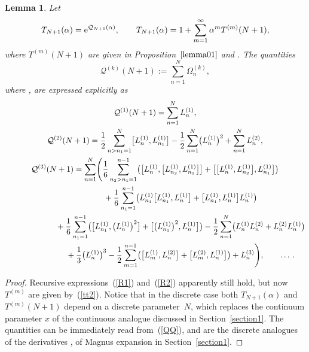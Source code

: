 \documentclass[pdftex]{sigma}
\numberwithin{equation}{section}
\newtheorem{lem}[thm]{Lemma}
\theoremstyle{definition}
\begin{document}
\begin{lem}\label{lemma2} Let
\[
T_{N+1}(\alpha) = {\rm e}^{{\mathcal Q}_{N+1}(\alpha)}, \qquad T_{N+1}(\alpha)= 1+ \sum_{m=1}^{\infty}\alpha^m T^{(m)}(N+1),
\]
 where $T^{(m)}({N+1})$ are given in Proposition~$\ref{lemma01}$ and . The quantities
\[
{\mathcal Q}^{(k)}(N+1):= \sum_{n=1}^N \Omega^{(k)}_n,\]
where , are expressed explicitly as
\begin{gather}
{\mathcal Q}^{(1)}(N+1) = \sum_{n=1}^{N} L^{(1)}_{n},\nonumber\\
{\mathcal Q}^{(2)}(N+1) = \frac{1}{2}\sum_{n>n_1=1}^{N} \bigl[ L^{(1)}_{n}, L^{(1)}_{n_1} \bigr] -
\frac{1}{2}\sum_{n=1}^{N} \bigl(L^{(1)}_{n}\bigr)^2+\sum_{n=1}^NL_n^{(2)},
\nonumber\\
{\mathcal Q}^{(3)}(N+1) = \sum_{n=1}^N \Biggl(\frac{1}{6} \sum_{n_2>n_1=1}^{n-1}
\bigl(\bigl[L^{(1)}_{n}, \bigl[L^{(1)}_{n_2}, L^{(1)}_{n_1} \bigr] \bigr] +
\bigl[\bigl[L^{(1)}_{n}, L^{(1)}_{n_2} \bigr], L^{(1)}_{n_1} \bigr]\bigr) \nonumber\\
\hphantom{{\mathcal Q}^{(3)}(N+1) = }{}
 + \frac{1}{6} \sum_{n_1=1}^{n-1} \bigl( L^{(1)}_{n_1}\bigl[L^{(1)}_{n_1},
L^{(1)}_{n}\bigr] + \bigl[L^{(1)}_{n_1}, L^{(1)}_{n}\bigr] L^{(1)}_{n}\bigr) \nonumber\\
\hphantom{{\mathcal Q}^{(3)}(N+1) = }{} +
\frac{1}{6} \sum_{n_1=1}^{n-1} \bigl(\bigl[L^{(1)}_{n_1}, \bigl(L^{(1)}_{n}\bigr)^2\bigr] +
\bigl[\bigl(L^{(1)}_{n_1}\bigr)^2, L^{(1)}_{n}\bigr] \bigr)-\frac{1}{2} \sum_{n=1}^{N} \bigl(L_n^{(1)} L_n^{(2)} +
L_n^{(2)} L_n^{(1)} \bigr)\nonumber\\
\hphantom{{\mathcal Q}^{(3)}(N+1) = }{}
+ \frac{1}{3} \bigl(L^{(1)}_{n}\bigr)^3 - \frac{1}{2} \sum_{m=1}^{n-1}
\bigl( \bigl[L^{(1)}_m, L_n^{(2)} \bigr] +\bigl[L^{(2)}_m, L^{(1)}_n \bigr] \bigr) + L_n^{(3)} \Biggr), \qquad \dots\,. \label{QQ}
\end{gather}
\end{lem}
\begin{proof}
{Recursive expressions~(\ref{R1}) and~(\ref{R2}) apparently still hold, but now $T^{(m)}$ are given by~(\ref{tt2}).
Notice that in the discrete case both $T_{N+1}(\alpha)$ and $T^{(m)}(N+1)$ depend on a discrete parameter~$N$,
which replaces the continuum parameter $x$ of the continuous analogue discussed in Section~\ref{section1}. The quantities  can be immediately read from~(\ref{QQ}), and are the discrete analogues of the derivatives , of Magnus expansion in Section~\ref{section1}.}
\end{proof}
\end{document}
